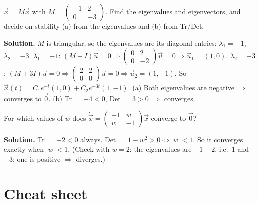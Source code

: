 \begin{example}
$\dot{\vec x} = M\vec x$ with $M = \begin{pmatrix}-1 & 2\\ 0 & -3\end{pmatrix}$. Find the eigenvalues and eigenvectors, and decide on stability (a) from the eigenvalues and (b) from Tr/Det.

\textbf{Solution.} $M$ is triangular, so the eigenvalues are its diagonal entries: $\lambda_1=-1$, $\lambda_2=-3$.
$\lambda_1=-1$: $(M+I)\vec u = 0 \Rightarrow \begin{pmatrix}0&2\\0&-2\end{pmatrix}\vec u=0 \Rightarrow \vec u_1 = (1,0)$.
$\lambda_2=-3$: $(M+3I)\vec u=0 \Rightarrow \begin{pmatrix}2&2\\0&0\end{pmatrix}\vec u = 0\Rightarrow \vec u_2 = (1,-1)$.
So $\vec x(t) = C_1e^{-t}(1,0) + C_2e^{-3t}(1,-1)$.
(a) Both eigenvalues are negative $\Rightarrow$ converges to $\vec 0$. (b) Tr $=-4<0$, Det $=3>0$ $\Rightarrow$ converges. \checkmark
\end{example}

\begin{example}
For which values of $w$ does $\dot{\vec x} = \begin{pmatrix}-1 & w\\ w & -1\end{pmatrix}\vec x$ converge to $\vec 0$?

\textbf{Solution.} Tr $=-2<0$ always. Det $=1-w^2>0 \iff |w|<1$. So it converges exactly when $|w|<1$.
(Check with $w=2$: the eigenvalues are $-1\pm2$, i.e.\ $1$ and $-3$; one is positive $\Rightarrow$ diverges.)
\end{example}

\section{Cheat sheet}

